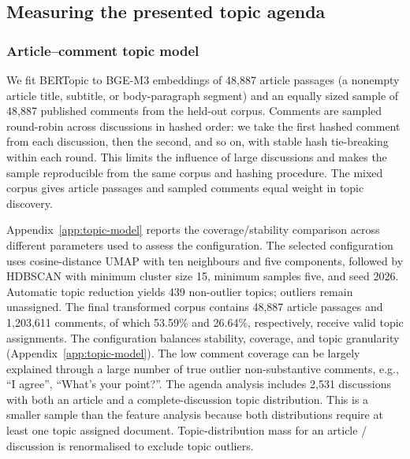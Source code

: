 \subsection{Measuring the presented topic agenda}
\label{sec:topics}
\subsubsection{Article--comment topic model}
We fit BERTopic \citep{Grootendorst2022BERTopic} to BGE-M3 embeddings \citep{chen2024m3} of 48,887 article passages (a nonempty article title, subtitle, or body-paragraph segment) and an equally sized sample of 48,887 published comments from the held-out corpus. Comments are sampled round-robin across discussions in hashed order: we take the first hashed comment from each discussion, then the second, and so on, with stable hash tie-breaking within each round. This limits the influence of large discussions and makes the sample reproducible from the same corpus and hashing procedure. The mixed corpus gives article passages and sampled comments equal weight in topic discovery.

Appendix~\ref{app:topic-model} reports the coverage/stability comparison across different parameters used to assess the configuration. The selected configuration uses cosine-distance UMAP with ten neighbours and five components, followed by HDBSCAN with minimum cluster size 15, minimum samples five, and seed 2026. Automatic topic reduction yields 439 non-outlier topics; outliers remain unassigned. The final transformed corpus contains 48,887 article passages and 1,203,611 comments, of which 53.59\% and 26.64\%, respectively, receive valid topic assignments. The configuration balances stability, coverage, and topic granularity (Appendix~\ref{app:topic-model}). The low comment coverage can be largely explained through a large number of true outlier non-substantive comments, e.g., ``I agree'', ``What's your point?''. The agenda analysis includes 2,531 discussions with both an article and a complete-discussion topic distribution. This is a smaller sample than the feature analysis because both distributions require at least one topic assigned document. Topic-distribution mass for an article / discussion is renormalised to exclude topic outliers.

